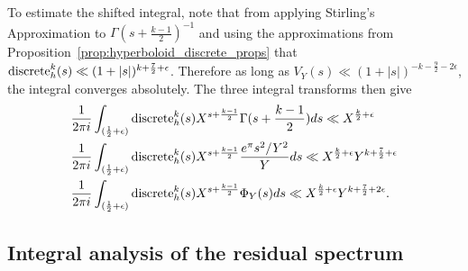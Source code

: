 To estimate the shifted integral, note that from applying Stirling's Approximation to
$\Gamma(s+\frac{k-1}{2})^{-1}$ and using the approximations from
Proposition~\ref{prop:hyperboloid_discrete_props} that $\operatorname{discrete}_h^k(s) \ll (1 + \lvert s
\rvert)^{k + \frac{7}{2} +\epsilon}$.
Therefore as long as $V_Y(s) \ll (1 + \lvert s \rvert)^{-k - \frac{9}{2} - 2\epsilon}$,
the integral converges absolutely.
The three integral transforms then give
\begin{align}
  &\frac{1}{2\pi i} \int_{(\frac{1}{2} + \epsilon)} \operatorname{discrete}_h^k(s) X^{s + \frac{k-1}{2}}
  \Gamma(s + \frac{k-1}{2})  ds \ll X^{\frac{k}{2} + \epsilon}
  \label{eq:hyperboloid:discrete_gamma_integral_bound}\\
  &\frac{1}{2\pi i} \int_{(\frac{1}{2} + \epsilon)} \operatorname{discrete}_h^k(s) X^{s + \frac{k-1}{2}}
  \frac{e^\pi s^2/Y^2}{Y} ds \ll X^{\frac{k}{2} + \epsilon} Y^{k + \frac{7}{2} + \epsilon}
  \label{eq:hyperboloid:discrete_concentrating_integral_bound} \\
  &\frac{1}{2\pi i} \int_{(\frac{1}{2} + \epsilon)} \operatorname{discrete}_h^k(s) X^{s + \frac{k-1}{2}}
  \Phi_Y(s) ds \ll X^{\frac{k}{2}+ \epsilon} Y^{k + \frac{7}{2} + 2\epsilon}.
  \label{eq:hyperboloid:discrete_compact_integral_bound}
\end{align}


\subsection{Integral analysis of the residual spectrum}


